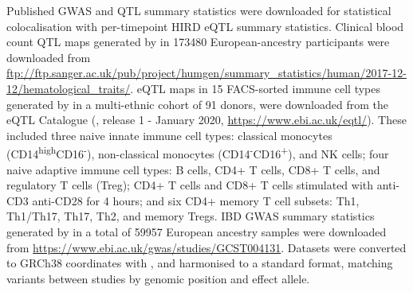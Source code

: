 Published \gls{GWAS} and \gls{QTL} summary statistics were downloaded for statistical colocalisation with per-timepoint \gls{HIRD} \gls{eQTL} summary statistics.
Clinical blood count \gls{QTL} maps generated by \textcite{astle2016AllelicLandscapeHuman} in \num{173480} European-ancestry participants were downloaded from \url{ftp://ftp.sanger.ac.uk/pub/project/humgen/summary_statistics/human/2017-12-12/hematological_traits/}.
\gls{eQTL} maps in 15 \gls{FACS}-sorted immune cell types generated by \textcite{schmiedel2018ImpactGeneticPolymorphisms} in a multi-ethnic cohort of 91 donors,
were downloaded from the eQTL Catalogue (\autocite{kerimov2020EQTLCatalogueCompendium}, release 1 - January 2020, \url{https://www.ebi.ac.uk/eqtl/}).
These included
three naive innate immune cell types: 
    classical monocytes (CD14\textsuperscript{high}CD16\textsuperscript{-}),
    non-classical monocytes (CD14\textsuperscript{-}CD16\textsuperscript{+}),
    and \gls{NK} cells;
four naive adaptive immune cell types:
    B cells, CD4+ T cells, CD8+ T cells, and regulatory T cells (Treg);
CD4+ T cells and CD8+ T cells stimulated with anti-CD3 anti-CD28 for 4 hours;
and six CD4+ memory T cell subsets:
    Th1, Th1/Th17, Th17, Th2, and memory Tregs.
\gls{IBD} \gls{GWAS} summary statistics generated by \textcite{delange2017GenomewideAssociationStudy} in a total of \num{59957} European ancestry samples were downloaded from \url{https://www.ebi.ac.uk/gwas/studies/GCST004131}.
Datasets were converted to GRCh38 coordinates with ,
and harmonised to a standard format, matching variants between studies by genomic position and effect allele.

